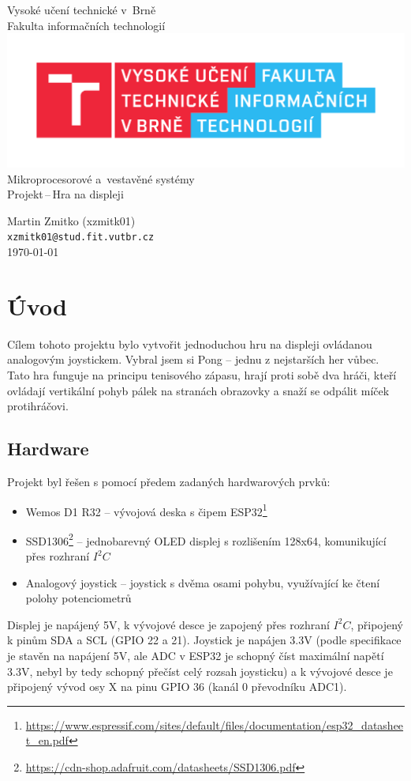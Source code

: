 \documentclass[a4paper, 11pt]{article}
\begin{document}
\begin{center}
    {\Large
        Vysoké učení technické v~Brně \\
        Fakulta informačních technologií \\
    }
    \includegraphics[width=0.4 \linewidth]{inc/FIT_logo.pdf} \\

    {\LARGE
        Mikroprocesorové a~vestavěné systémy \\
        Projekt\,--\,Hra na displeji \\[0.4cm]
    }

    {\large
        Martin Zmitko (xzmitk01) \\
        \texttt{xzmitk01@stud.fit.vutbr.cz} \\
        \today
    }
\end{center}
\vspace{0.7cm}

\section{Úvod}
Cílem tohoto projektu bylo vytvořit jednoduchou hru na displeji ovládanou analogovým joystickem.
Vybral jsem si Pong -- jednu z nejstarších her vůbec.
Tato hra funguje na principu tenisového zápasu, hrají proti sobě dva hráči, kteří ovládají vertikální pohyb pálek na stranách obrazovky a snaží se odpálit míček protihráčovi.

\subsection{Hardware}
Projekt byl řešen s pomocí předem zadaných hardwarových prvků:
\begin{itemize}
    \item Wemos D1 R32 -- vývojová deska s čipem ESP32\footnote{\url{https://www.espressif.com/sites/default/files/documentation/esp32_datasheet_en.pdf}}
    \item SSD1306\footnote{\url{https://cdn-shop.adafruit.com/datasheets/SSD1306.pdf}} -- jednobarevný OLED displej s rozlišením 128x64, komunikující přes rozhraní $I^2C$
    \item Analogový joystick -- joystick s dvěma osami pohybu, využívající ke čtení polohy potenciometrů
\end{itemize}
Displej je napájený 5V, k vývojové desce je zapojený přes rozhraní $I^2C$, připojený k pinům SDA a SCL (GPIO 22 a 21).
Joystick je napájen 3.3V (podle specifikace je stavěn na napájení 5V, ale ADC v ESP32 je schopný číst maximální napětí 3.3V, nebyl by tedy schopný přečíst celý rozsah joysticku) a k vývojové desce je připojený vývod osy X na pinu GPIO 36 (kanál 0 převodníku ADC1).
\end{document}
